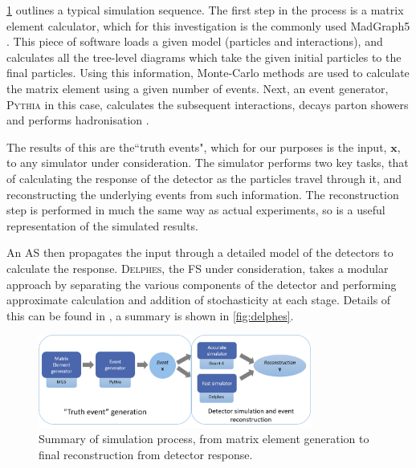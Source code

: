 \documentclass[twocolumn]{article}
\newcommand{\pkg}[1]{\textsc{#1}}
\begin{document}
\cref{fig:simdiag} outlines a typical simulation sequence. The first step in the process is a matrix element calculator, which for this investigation is the commonly used MadGraph5 \cite{madgraph}. This piece of software loads a given model (particles and interactions), and calculates all the tree-level diagrams which take the given initial particles to the final particles. Using this information, Monte-Carlo methods are used to calculate the matrix element using a given number of events. Next, an event generator, \pkg{Pythia} in this case, calculates the subsequent interactions, decays parton showers and performs hadronisation \cite{Gieseke2012}.

The results of this are the``truth events", which for our purposes is the input, $\mathbf{x}$, to any simulator under consideration. The simulator performs two key tasks, that of calculating the response of the detector as the particles travel through it, and reconstructing the underlying events from such information. The reconstruction step is performed in much the same way as actual experiments, so is a useful representation of the simulated results.

An AS then propagates the input through a detailed model of the detectors to calculate the response. \pkg{Delphes}, the FS under consideration, takes a modular approach by separating the various components of the detector and performing approximate calculation and addition of stochasticity at each stage. Details of this can be found in \cite{delphes}, a summary is shown in \cref{fig:delphes}.        
\vfill
\begin{figure}[!htbp]
	\centering
	\includegraphics[width=0.8\textwidth]{simdiag}
	
	\caption{Summary of simulation process, from matrix element generation to final reconstruction from detector response.}
	\label{fig:simdiag}
	
\end{figure}	
\end{document}
